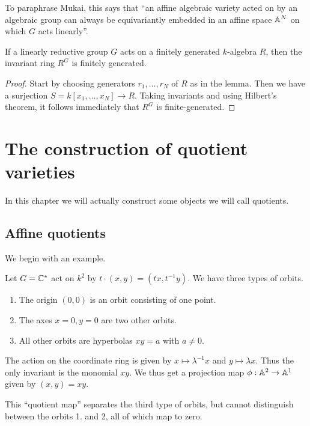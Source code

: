 \documentclass[11pt, english]{article}
\begin{document}
To paraphrase Mukai, this says that ``an affine algebraic variety acted on by an algebraic group can always be equivariantly embedded in an affine space $\mathbb{A}^N$ on which $G$ acts linearly''.

\begin{thm}
If a linearly reductive group $G$ acts on a finitely generated $k$-algebra $R$, then the invariant ring $R^G$ is finitely generated.
\end{thm}
\begin{proof}
Start by choosing generators $r_1,\ldots,r_N$ of $R$ as in the lemma. Then we have a surjection $S=k[x_1,\ldots,x_N] \to R$. Taking invariants and using Hilbert's theorem, it follows immediately that $R^G$ is finite-generated.
\end{proof}

\section{The construction of quotient varieties}

In this chapter we will actually construct some objects we will call quotients. 

\subsection{Affine quotients}

We begin with an example.
\begin{example}
Let $G = \mathbb{C}^\ast$ act on $k^2$ by $t \cdot (x,y) = (tx,t^{-1} y)$. We have three types of orbits.
\begin{enumerate}
\item The origin $(0,0)$ is an orbit consisting of one point.
\item The axes $x=0,y=0$ are two other orbits.
\item All other orbits are hyperbolas $xy=a$ with $a \neq 0$.
\end{enumerate}
The action on the coordinate ring is given by $x \mapsto \lambda^{-1}x$ and $y \mapsto \lambda x$. Thus the only invariant is the monomial $xy$. We thus get a projection map $\phi:\mathbb{A}^2 \to \mathbb{A}^1$ given by $(x,y)=xy$.

This ``quotient map'' separates the third type of orbits, but cannot distinguish between the orbits 1. and 2, all of which map to zero. 
\end{example}
\end{document}
